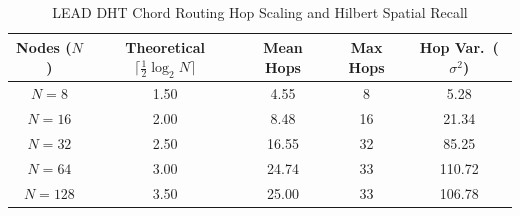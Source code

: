 \begin{table}[t]
\centering
\caption{LEAD DHT Chord Routing Hop Scaling and Hilbert Spatial Recall}
\label{tab:dht_routing_and_recall}
\small
\begin{tabular}{ccccc}
\hline
\textbf{Nodes ($N$)} &
\textbf{Theoretical $\lceil\tfrac{1}{2}\log_2 N\rceil$} &
\textbf{Mean Hops} &
\textbf{Max Hops} &
\textbf{Hop Var.\ ($\sigma^2$)} \\
\hline
$N = 8$   & 1.50 &  4.55 &  8 &   5.28 \\
$N = 16$  & 2.00 &  8.48 & 16 &  21.34 \\
$N = 32$  & 2.50 & 16.55 & 32 &  85.25 \\
$N = 64$  & 3.00 & 24.74 & 33 & 110.72 \\
$N = 128$ & 3.50 & 25.00 & 33 & 106.78 \\
\hline
\end{tabular}
\normalsize
\end{table}

